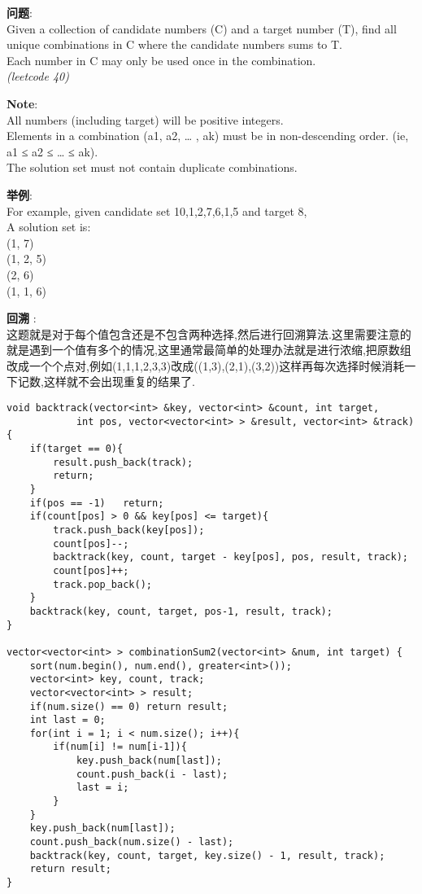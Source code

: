     
\begin{description}
    \item{\textbf{问题}}:\\
Given a collection of candidate numbers (C) and a target number (T), find all unique combinations in C where the candidate numbers sums to T.\\
Each number in C may only be used once in the combination.\\
\textit{(leetcode 40)}
    \item{\textbf{Note}}:\\
All numbers (including target) will be positive integers.\\
Elements in a combination (a1, a2, … , ak) must be in non-descending order. (ie, a1 ≤ a2 ≤ … ≤ ak).\\
The solution set must not contain duplicate combinations.\\
    \item{\textbf{举例}}:\\
For example, given candidate set 10,1,2,7,6,1,5 and target 8, \\
A solution set is: \\
(1, 7) \\
(1, 2, 5)\\ 
(2, 6) \\
(1, 1, 6)\\ 
    \item{\textbf{回溯}} : 
    \\这题就是对于每个值包含还是不包含两种选择,然后进行回溯算法.这里需要注意的就是遇到一个值有多个的情况,这里通常最简单的处理办法就是进行浓缩,把原数组改成一个个点对,例如(1,1,1,2,3,3)改成((1,3),(2,1),(3,2))这样再每次选择时候消耗一下记数,这样就不会出现重复的结果了.
    \begin{lstlisting}
void backtrack(vector<int> &key, vector<int> &count, int target,
			int pos, vector<vector<int> > &result, vector<int> &track){
	if(target == 0){
		result.push_back(track);
		return;
	}
	if(pos == -1)	return;
	if(count[pos] > 0 && key[pos] <= target){
		track.push_back(key[pos]);
		count[pos]--;
		backtrack(key, count, target - key[pos], pos, result, track);
		count[pos]++;
		track.pop_back();
	}
	backtrack(key, count, target, pos-1, result, track);
}

vector<vector<int> > combinationSum2(vector<int> &num, int target) {
	sort(num.begin(), num.end(), greater<int>());
	vector<int> key, count, track;
	vector<vector<int> > result;
	if(num.size() == 0)	return result;
	int last = 0;
	for(int i = 1; i < num.size(); i++){
		if(num[i] != num[i-1]){
			key.push_back(num[last]);
			count.push_back(i - last);
			last = i;
		}
	}
	key.push_back(num[last]);
	count.push_back(num.size() - last);
	backtrack(key, count, target, key.size() - 1, result, track);
	return result;
}
    \end{lstlisting}
\end{description}
